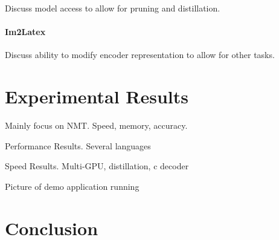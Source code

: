 \documentclass[11pt]{article}
\begin{document}
Discuss model access to allow for pruning and distillation. 

\paragraph{Im2Latex}

Discuss ability to modify encoder representation to allow for other tasks. 

\section{Experimental Results}

Mainly focus on NMT. Speed, memory, accuracy. 

\begin{table}
  \centering
  
  \caption{Performance Results. Several languages}
\end{table}


\begin{table}
  \centering
  
  \caption{Speed Results. Multi-GPU, distillation, c decoder}
\end{table}

Picture of demo application running 

\section{Conclusion}




\end{document}
